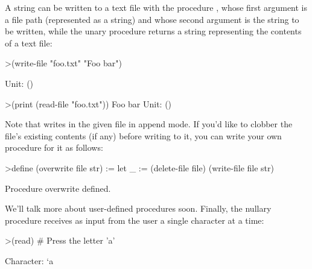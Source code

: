 A string can be written to a text file with the procedure , whose first argument is a file path (represented as a string) and whose second argument
is the string to be written, while the unary procedure  returns a string representing the contents of a text file: 
\begin{tcAthena}[upquote=true]
>(write-file "foo.txt" "Foo bar")

Unit: ()

>(print (read-file "foo.txt"))
Foo bar
Unit: ()
\end{tcAthena}
Note that  writes in the given file in append mode. If you'd like to clobber the file's existing contents (if any)  
before writing to it, you can write your own procedure for it as follows:
\begin{tcAthena}[upquote=true]
>define (overwrite file str) := 
   let {_ := (delete-file file)}
     (write-file file str)

Procedure overwrite defined.
\end{tcAthena}
We'll talk more about user-defined procedures soon. Finally, the nullary procedure  receives as input from the user a single character at a time:
\begin{tcAthena}[upquote=true]
>(read) # Press the letter 'a'

Character: `a
\end{tcAthena}

